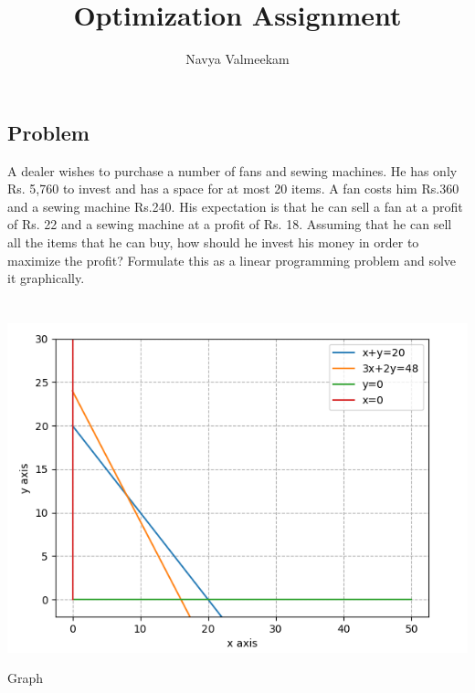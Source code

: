 \documentclass[journal,12pt,twocolumn]{IEEEtran}
\title{Optimization Assignment}
\author{Navya Valmeekam}
\begin{document}
\providecommand{\norm}[1]{\left\lVert#1\right\rVert}
\maketitle
\begin{tableofcontents}
\section{Problem}
\noindent A dealer wishes to purchase a number of fans and sewing machines. He has only Rs. 5,760 to invest and has a space for at most 20 items. A fan costs him Rs.360 and a sewing machine Rs.240. His expectation is that he can sell a fan at a profit of Rs. 22 and a sewing machine at a profit of Rs. 18. Assuming that he can sell all the items that he can buy, how should he invest his money in order to maximize the profit? Formulate this as a linear programming problem and solve it graphically. 
\\
\\
\\
\includegraphics[scale=0.43]{graph.png} 
\begin{center}
Graph
\end{center}
\vspace{0.3cm}

\end{tableofcontents}
\end{document}
